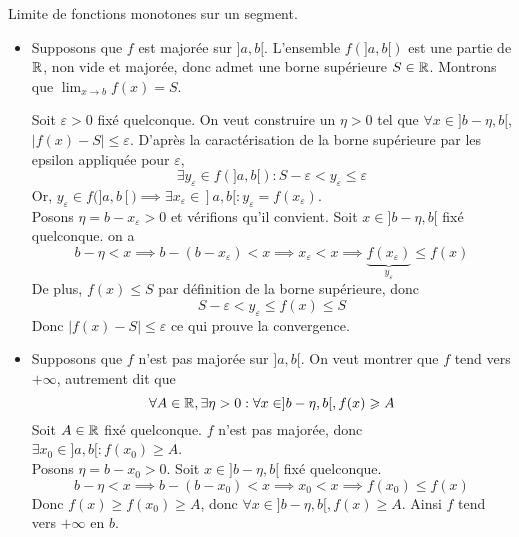 \documentclass{article}
\begin{document}
{Limite de fonctions monotones sur un segment.}
	\hfill\\
	\begin{itemize}[label=$\star$]
		\item Supposons que $f$ est majorée sur $]a, b[$. L'ensemble $f(]a, b[)$ est une partie de $\mathbb R$, non vide et majorée, donc admet une borne supérieure $S \in \mathbb R$.
						      Montrons que $\lim_{ x \to b }f(x) = S$.

						      Soit $\varepsilon>0$ fixé quelconque. On veut construire un $\eta>0$ tel que $\forall x \in ]b-\eta, b[$, $\lvert f(x) - S \rvert \leqslant \varepsilon$.
						      D'après la caractérisation de la borne supérieure par les epsilon appliquée pour $\varepsilon$, $$\exists y_{\varepsilon} \in f(]a, b[) : S - \varepsilon < y_{\varepsilon} \leqslant \varepsilon$$
					      Or, $y_{\varepsilon} \in f(]a, b[) \implies \exists x_{\varepsilon}\in ]a, b[ : y_{\varepsilon} = f(x_{\varepsilon})$.\\
						      Posons $\eta = b - x_{\varepsilon} > 0$ et vérifions qu'il convient.
						      Soit $x \in ]b - \eta, b[$ fixé quelconque.
		      on a $$
			      b-\eta < x \implies b- (b - x_{\varepsilon})< x \implies x_{\varepsilon} < x \implies \underbrace{ f(x_{\varepsilon}) }_{ y_{\varepsilon} } \leqslant f(x)
		      $$
		      De plus, $f(x) \leqslant S$ par définition de la borne supérieure, donc
		      $$
			      S - \varepsilon < y_{\varepsilon} \leqslant f(x) \leqslant S
		      $$
		      Donc $\lvert f(x) - S \rvert \leqslant \varepsilon$ ce qui prouve la convergence.

		\item Supposons que $f$ n'est pas majorée sur $]a, b[$.
						      On veut montrer que $f$ tend vers $+\infty$, autrement dit que
					      $$
					      \forall A \in \mathbb R, \exists \eta >0 : \forall x \in ]b- \eta , b[, f(x)\geqslant A
					      $$
					      Soit $A \in \mathbb R$ fixé quelconque.
					      $f$ n'est pas majorée, donc $\exists x_{0} \in ]a, b[ : f(x_{0}) \geqslant A$.\\
						      Posons $\eta = b - x_{0} > 0$.
						      Soit $x \in ]b-\eta, b[$ fixé quelconque.
		      $$
			      b-\eta< x \implies b-(b-x_{0})< x \implies x_{0}<x \implies f(x_{0}) \leqslant f(x)
		      $$
		      Donc $f(x) \geqslant f(x_{0})\geqslant A$, donc $\forall x \in ]b-\eta, b[, f(x) \geqslant A$.
		      Ainsi $f$ tend vers $+\infty$ en $b$.
	\end{itemize}
\end{question_kholle}
\end{document}
